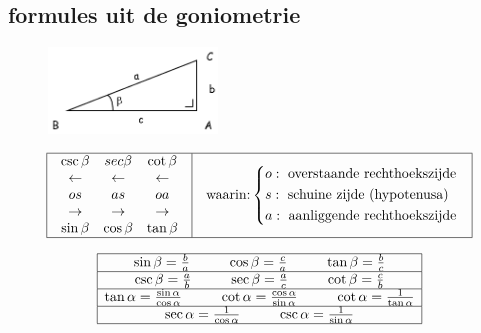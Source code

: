 \documentclass[a5paper]{article}
\begin{document}
\subsection{formules uit de goniometrie}

\begin{figure}[h]
\centering
\includegraphics[width=0.4\textwidth]{image_goniometrie_sin_cos_tan.png}
\label{fig:sin_cos_tan}
\end{figure}


\[\begin{array}{|c|c|}
\hline
\begin{array}{*{20}{c}}
{\csc \beta }&{sec\beta }&{\cot \beta }\\
 \leftarrow & \leftarrow & \leftarrow \\
{os}&{as}&{oa}\\
 \to & \to & \to \\
{\sin \beta }&{\cos \beta }&{\tan \beta }
\end{array}

& %

\begin{array}{l}
\text{waarin:} 
\left\{
\begin{aligned}
& o: \text{ overstaande rechthoekszijde} \\
& s: \text{ schuine zijde (hypotenusa)} \\
& a: \text{ aanliggende rechthoekszijde}
\end{aligned}
\right.
\end{array} \\ 
\hline
\end{array}
\]

\[
\begin{array}{|c|c|}
\hline
\text{sin} \, \beta = \frac{b}{a} \hspace{1cm} \text{cos} \, \beta = \frac{c}{a} \hspace{1cm} \text{tan} \, \beta = \frac{b}{c} \\
\hline
\text{csc} \, \beta = \frac{a}{b} \hspace{1cm} \text{sec} \, \beta = \frac{a}{c} \hspace{1cm} \text{cot} \, \beta = \frac{c}{b} \\
\hline
\text{tan} \, \alpha = \frac{\sin \alpha}{\cos \alpha} \hspace{1cm} \text{cot} \, \alpha = \frac{\cos \alpha}{\sin \alpha} \hspace{1cm} \text{cot} \, \alpha = \frac{1}{\tan \alpha} \\
\hline
\text{sec} \, \alpha = \frac{1}{\cos \alpha} \hspace{1cm} \text{csc} \, \alpha = \frac{1}{\sin \alpha}\\
\hline
\end{array}
\]
\end{document}
